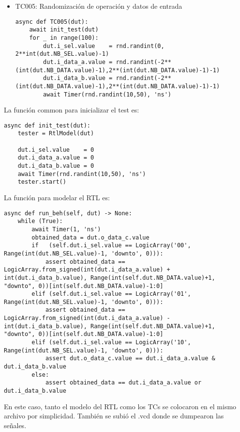 \begin{itemize}
    \item TC005: Randomización de operación y datos de entrada
        \begin{verbatim}
async def TC005(dut):
    await init_test(dut)
    for _ in range(100):
        dut.i_sel.value    = rnd.randint(0, 2**int(dut.NB_SEL.value)-1)
        dut.i_data_a.value = rnd.randint(-2**(int(dut.NB_DATA.value)-1),2**(int(dut.NB_DATA.value)-1)-1)
        dut.i_data_b.value = rnd.randint(-2**(int(dut.NB_DATA.value)-1),2**(int(dut.NB_DATA.value)-1)-1)
        await Timer(rnd.randint(10,50), 'ns')
        \end{verbatim}
\end{itemize}

La función common para inicializar el test es:
\begin{verbatim}
async def init_test(dut):
    tester = RtlModel(dut)

    dut.i_sel.value    = 0
    dut.i_data_a.value = 0
    dut.i_data_b.value = 0
    await Timer(rnd.randint(10,50), 'ns')
    tester.start()
\end{verbatim}

La función para modelar el RTL es:
\begin{verbatim}
async def run_beh(self, dut) -> None:
    while (True):
        await Timer(1, 'ns')
        obtained_data = dut.o_data_c.value
        if   (self.dut.i_sel.value == LogicArray('00', Range(int(dut.NB_SEL.value)-1, 'downto', 0))):
            assert obtained_data == LogicArray.from_signed(int(dut.i_data_a.value) + int(dut.i_data_b.value), Range(int(self.dut.NB_DATA.value)+1, "downto", 0))[int(self.dut.NB_DATA.value)-1:0]
        elif (self.dut.i_sel.value == LogicArray('01', Range(int(dut.NB_SEL.value)-1, 'downto', 0))):
            assert obtained_data == LogicArray.from_signed(int(dut.i_data_a.value) - int(dut.i_data_b.value), Range(int(self.dut.NB_DATA.value)+1, "downto", 0))[int(self.dut.NB_DATA.value)-1:0]
        elif (self.dut.i_sel.value == LogicArray('10', Range(int(dut.NB_SEL.value)-1, 'downto', 0))):
            assert dut.o_data_c.value == dut.i_data_a.value & dut.i_data_b.value
        else:
            assert obtained_data == dut.i_data_a.value or dut.i_data_b.value
\end{verbatim}

En este caso, tanto el modelo del RTL como los TCs se colocaron en el mismo archivo por simplicidad. También se subió el .vcd donde se dumpearon las señales.

